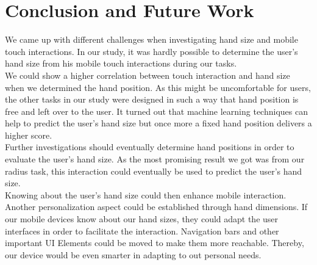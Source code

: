 \documentclass{sigchi}
\begin{document}
\section{Conclusion and Future Work}
We came up with different challenges when investigating hand size and mobile touch interactions. In our study, it was hardly possible to determine the user's hand size from his mobile touch interactions during our tasks.\\
We could show a higher correlation between touch interaction and hand size when we determined the hand position. As this might be uncomfortable for users, the other tasks in our study were designed in such a way that hand position is free and left over to the user. It turned out that machine learning techniques can help to predict the user's hand size but once more a fixed hand position delivers a higher score.\\
Further investigations should eventually determine hand positions in order to evaluate the user's hand size. As the most promising result we got was from our radius task, this interaction could eventually be used to predict the user's hand size.\\ 
Knowing about the user's hand size could then enhance mobile interaction. Another personalization aspect could be established through hand dimensions. If our mobile devices know about our hand sizes, they could adapt the user interfaces in order to facilitate the interaction. Navigation bars and other important UI Elements could be moved to make them more reachable. Thereby, our device would be even smarter in adapting to out personal needs.




%
%
%
%
%
\balance{}


\balance{}



\end{document}
